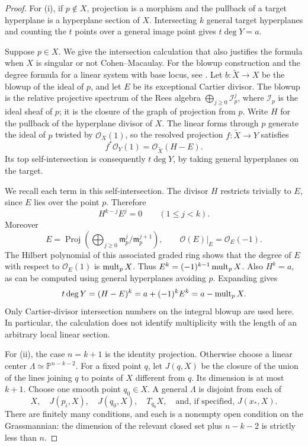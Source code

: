 \begin{proof}
For (i), if $p\notin X$, projection is a morphism and the pullback of a target hyperplane is a hyperplane section of $X$.  Intersecting $k$ general target hyperplanes and counting the $t$ points over a general image point gives $t\deg Y=a$.

Suppose $p\in X$.  We give the intersection calculation that also justifies the formula when $X$ is singular or not Cohen--Macaulay. For the blowup construction and the degree formula for a linear system with base locus, see \cite[Appendix~B.6 and Proposition~4.4]{Ful}. Let $b:\widetilde X\longrightarrow X$ be the blowup of the ideal of $p$, and let $E$ be its exceptional Cartier divisor.  The blowup is the relative projective spectrum of the Rees algebra $\bigoplus_{j\ge0}\mathcal{I}_p^j$, where $\mathcal{I}_p$ is the ideal sheaf of $p$; it is the closure of the graph of projection from $p$.  Write $H$ for the pullback of the hyperplane divisor of $X$.  The linear forms through $p$ generate the ideal of $p$ twisted by $\mathcal{O}_X(1)$, so the resolved projection $f:\widetilde X\longrightarrow Y$ satisfies
\[
 f^*\mathcal{O}_Y(1)=\mathcal{O}_{\widetilde X}(H-E).
\]
Its top self-intersection is consequently $t\deg Y$, by taking general hyperplanes on the target.

We recall each term in this self-intersection.  The divisor $H$ restricts trivially to $E$, since $E$ lies over the point $p$. Therefore
\[
 H^{k-j}E^j=0\qquad(1\le j<k).
\]
Moreover
\[
 E=\operatorname{Proj}\!\left(
       \bigoplus_{j\ge0}\mathfrak{m}_p^j/\mathfrak{m}_p^{j+1}\right),
 \qquad \mathcal{O}(E)|_E=\mathcal{O}_E(-1).
\]
The Hilbert polynomial of this associated graded ring shows that the degree of $E$ with respect to $\mathcal{O}_E(1)$ is $\operatorname{mult}_pX$.  Thus $E^k=(-1)^{k-1}\operatorname{mult}_pX$.  Also $H^k=a$, as can be computed using general hyperplanes avoiding $p$.  Expanding gives
\[
 t\deg Y=(H-E)^k=a+(-1)^kE^k=a-\operatorname{mult}_pX.
\]
Only Cartier-divisor intersection numbers on the integral blowup are used here.  In particular, the calculation does not identify multiplicity with the length of an arbitrary local linear section.

For (ii), the case $n=k+1$ is the identity projection.  Otherwise choose a linear center $\Lambda\simeq\mathbb{P}^{n-k-2}$.  For a fixed point $q$, let $J(q,X)$ be the closure of the union of the lines joining $q$ to points of $X$ different from $q$.  Its dimension is at most $k+1$.  Choose one smooth point $q_0\in X$.  A general $\Lambda$ is disjoint from each of
\[
 X,\quad J(p_i,X),\quad J(q_0,X),\quad T_{q_0}X,
 \quad\text{and, if specified, }J(x_*,X).
\]
There are finitely many conditions, and each is a nonempty open condition on the Grassmannian: the dimension of the relevant closed set plus $n-k-2$ is strictly less than $n$.


\end{proof}
